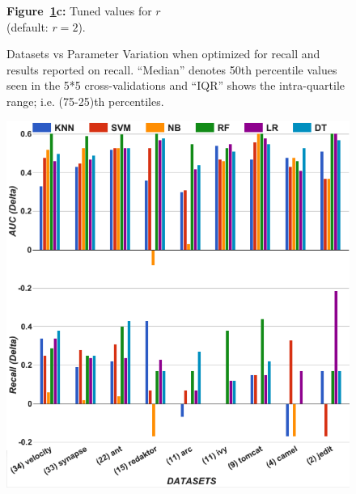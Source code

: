\documentclass[10pt,conference]{IEEEtran}
\theoremstyle{break}
\theoremstyle{break}
\begin{document}
\begin{figure}[!b]
\begin{minipage}{.33\textwidth}
        {\bf Figure~\ref{fig:para}c:} Tuned values for $r$\\ (default:  $r=2$).
    \end{minipage}
    \caption{Datasets vs Parameter Variation when optimized for recall and results reported on recall.
    ``Median'' denotes 50th percentile values seen in the 5*5 cross-validations and ``IQR'' shows the intra-quartile
    range; i.e. (75-25)th percentiles.}
    \label{fig:para}
\vspace{-0.4cm}
\end{figure}



 
\begin{figure}[!t]
\begin{minipage}{.5\linewidth}
\centering
        \includegraphics[width=.95\linewidth]{./fig/AUC_recall_tuned.png}
    \end{minipage}%
\begin{minipage}{.5\linewidth}
        \centering

\end{minipage}
\end{figure}
\end{document}
